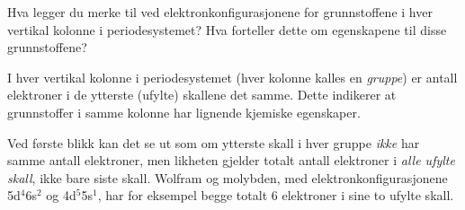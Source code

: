 

Hva legger du merke til ved elektronkonfigurasjonene for grunnstoffene i hver vertikal kolonne i periodesystemet? Hva forteller dette om egenskapene til disse grunnstoffene?







I hver vertikal kolonne i periodesystemet (hver kolonne kalles en {\it gruppe}) er antall elektroner i de ytterste (ufylte) skallene det samme. Dette indikerer at grunnstoffer i samme kolonne har lignende kjemiske egenskaper.

Ved første blikk kan det se ut som om ytterste skall i hver gruppe {\it ikke} har samme antall elektroner, men likheten gjelder totalt antall elektroner i {\it alle ufylte skall}, ikke bare siste skall. Wolfram og molybden, med elektronkonfigurasjonene 5d$^{4}$6s$^{2}$ og 4d$^{5}$5s$^{1}$, har for eksempel begge totalt 6 elektroner i sine to ufylte skall.










